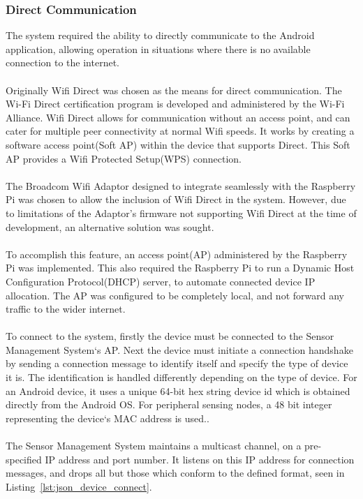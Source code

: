 \documentclass{article}
\begin{document}
\subsubsection{Direct Communication}
\label{sssec:sms_direct_comm}
The system required the ability to directly communicate to the Android application, allowing operation in situations where there is no available connection to the internet.\\\\
Originally Wifi Direct was chosen as the means for direct communication. The Wi-Fi Direct certification program is developed and administered by the Wi-Fi Alliance.
Wifi Direct allows for communication without an access point, and can cater for multiple peer connectivity at normal Wifi speeds. 
It works by creating a software access point(Soft AP) within the device that supports Direct. This Soft AP provides a Wifi Protected Setup(WPS) connection.\\\\
The Broadcom Wifi Adaptor designed to integrate seamlessly with the Raspberry Pi was chosen to allow the inclusion of Wifi Direct in the system. However, due to limitations of the Adaptor’s firmware not supporting Wifi Direct at the time of development, an alternative solution was sought. \\\\
To accomplish this feature, an access point(AP) administered by the Raspberry Pi was implemented. This also required the Raspberry Pi to run a Dynamic Host Configuration Protocol(DHCP) server, to automate connected device IP allocation. The AP was configured to be completely local, and not forward any traffic to the wider internet. \\\\
To connect to the system, firstly the device must be connected to the Sensor Management System\lq s AP. Next the device must initiate a connection handshake by sending a connection message to identify itself and specify the type of device it is. The identification is handled differently depending on the type of device. For an Android device, it uses a unique 64-bit hex string device id which is obtained directly from the Android OS. For peripheral sensing nodes, a 48 bit integer representing the device\lq s MAC address is used.. \\\\
The Sensor Management System maintains a multicast channel, on a pre-specified IP address and port number. It listens on this IP address for connection messages, and drops all but those which conform to the defined format, seen in Listing~\ref{lst:json_device_connect}. \\\\
\end{document}
